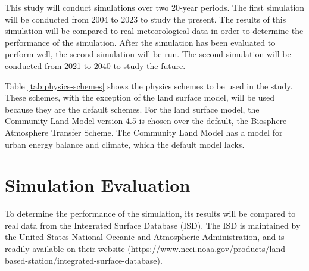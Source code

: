	This study will conduct simulations over two 20-year periods.
	The first simulation will be conducted from 2004 to 2023 to study the present.
	The results of this simulation will be compared to real meteorological data in order to determine the performance of the simulation.
	After the simulation has been evaluated to perform well, the second simulation will be run.
	The second simulation will be conducted from 2021 to 2040 to study the future.
	
	Table \ref{tab:physics-schemes} shows the physics schemes to be used in the study.
	These schemes, with the exception of the land surface model, will be used because they are the default schemes. 
	For the land surface model, the Community Land Model version 4.5 is chosen over the default, the Biosphere-Atmosphere Transfer Scheme. 
	The Community Land Model has a model for urban energy balance and climate, which the default model lacks.
	
\section{Simulation Evaluation}
	To determine the performance of the simulation, its results will be compared to real data from the Integrated Surface Database (ISD).
	The ISD is maintained by the United States National Oceanic and Atmospheric Administration, and is readily available on their website 
		(https://www.ncei.noaa.gov/products/land-based-station/integrated-surface-database).
	

